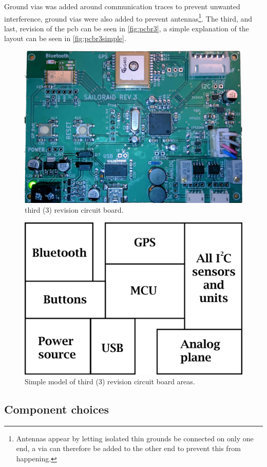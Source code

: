 Ground \gls{via}s was added around communication traces to prevent unwanted interference, ground \gls{via}s were also added to prevent antennas\footnote{Antennas appear by letting isolated thin grounds be connected on only one end, a \gls{via} can therefore be added to the other end to prevent this from happening.}.
The third, and last, revision of the \gls{pcb} can be seen in \autoref{fig:pcbr3}, a simple explanation of the layout can be seen in \autoref{fig:pcbr3simple}.
\begin{figure}[H]
	\centering
    \includegraphics[width=.8\linewidth]{Figures/pcb_rev3.jpg}
	\caption{third (3) revision circuit board.}
	\label{fig:pcbr3}
\end{figure}
\begin{figure}[H]
	\centering
    \includegraphics[width=.6\linewidth]{Figures/pcb_rev3_simple.png}
	\caption{Simple model of third (3) revision circuit board areas.}
	\label{fig:pcbr3simple}
\end{figure}

\subsection{Component choices}\label{sec:hw:tip1}


